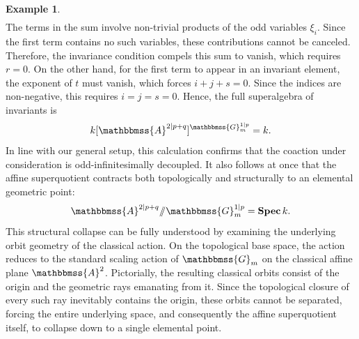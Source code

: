 \documentclass[11pt,a4paper,reqno,noamsfonts]{amsart}
\numberwithin{equation}{section}
\theoremstyle{definition}
\newtheorem{example}[theorem]{Example}
\theoremstyle{remark}
\renewcommand{\AA}{\ensuremath{\mathbbmss{A}}}
\newcommand{\GG}{\ensuremath{\mathbbmss{G}}}
\DeclareMathOperator{\sSpec}{\mathbf{Spec}}
\begin{document}
\begin{example}
$$\begin{aligned}
\end{aligned}
$$
The terms in the sum involve non-trivial products of the odd variables $\xi_{i}$. Since the first term contains no such variables, these contributions cannot be canceled. Therefore, the invariance condition compels this sum to vanish, which requires $r = 0$. On the other hand, for the first term to appear in an invariant element, the exponent of $t$ must vanish, which forces $i + j + s = 0$. Since the indices are non-negative, this requires $i=j = s =0$. Hence, the full superalgebra of invariants is
$$
k[\AA^{2\vert p+q}]^{\GG_m^{1 \vert p}} = k.
$$
In line with our general setup, this calculation confirms that the coaction under consideration is odd-infinitesimally decoupled. It also follows at once that the affine superquotient contracts both topologically and structurally to an elemental geometric point:
$$
\AA^{2\vert p+q} {\sslash} \GG_m^{1 \vert p} = \sSpec k.
$$
This structural collapse can be fully understood by examining the underlying orbit geometry of the classical action. On the topological base space, the action reduces to the standard scaling action of $\GG_{m}$ on the classical affine plane $\AA^{2}$. Pictorially, the resulting classical orbits consist of the origin and the geometric rays emanating from it. Since the topological closure of every such ray inevitably contains the origin, these orbits cannot be separated, forcing the entire underlying space, and consequently the affine superquotient itself, to collapse down to a single elemental point.
\end{example}
\end{document}
